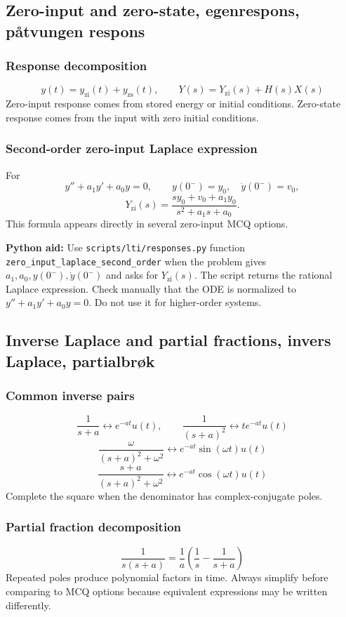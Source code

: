 \subsection{Zero-input and zero-state, egenrespons, påtvungen respons}

\subsubsection{Response decomposition}
\[
y(t)=y_{\mathrm{zi}}(t)+y_{\mathrm{zs}}(t),\qquad
Y(s)=Y_{\mathrm{zi}}(s)+H(s)X(s)
\]
Zero-input response comes from stored energy or initial conditions. Zero-state response comes from the input with zero initial conditions.

\subsubsection{Second-order zero-input Laplace expression}
For
\[
y''+a_1y'+a_0y=0,\qquad y(0^-)=y_0,\quad \dot y(0^-)=v_0,
\]
\[
Y_{\mathrm{zi}}(s)=\frac{s y_0+v_0+a_1y_0}{s^2+a_1s+a_0}.
\]
This formula appears directly in several zero-input MCQ options.

\textbf{Python aid:} Use \texttt{scripts/lti/responses.py} function \texttt{zero\_input\_laplace\_second\_order} when the problem gives \(a_1,a_0,y(0^-),\dot y(0^-)\) and asks for \(Y_{\mathrm{zi}}(s)\). The script returns the rational Laplace expression. Check manually that the ODE is normalized to \(y''+a_1y'+a_0y=0\). Do not use it for higher-order systems.

\subsection{Inverse Laplace and partial fractions, invers Laplace, partialbrøk}

\subsubsection{Common inverse pairs}
\[
\frac{1}{s+a}\leftrightarrow e^{-at}u(t),\qquad
\frac{1}{(s+a)^2}\leftrightarrow t e^{-at}u(t)
\]
\[
\frac{\omega}{(s+a)^2+\omega^2}\leftrightarrow e^{-at}\sin(\omega t)u(t)
\]
\[
\frac{s+a}{(s+a)^2+\omega^2}\leftrightarrow e^{-at}\cos(\omega t)u(t)
\]
Complete the square when the denominator has complex-conjugate poles.

\subsubsection{Partial fraction decomposition}
\[
\frac{1}{s(s+a)}=\frac{1}{a}\left(\frac{1}{s}-\frac{1}{s+a}\right)
\]
Repeated poles produce polynomial factors in time. Always simplify before comparing to MCQ options because equivalent expressions may be written differently.


